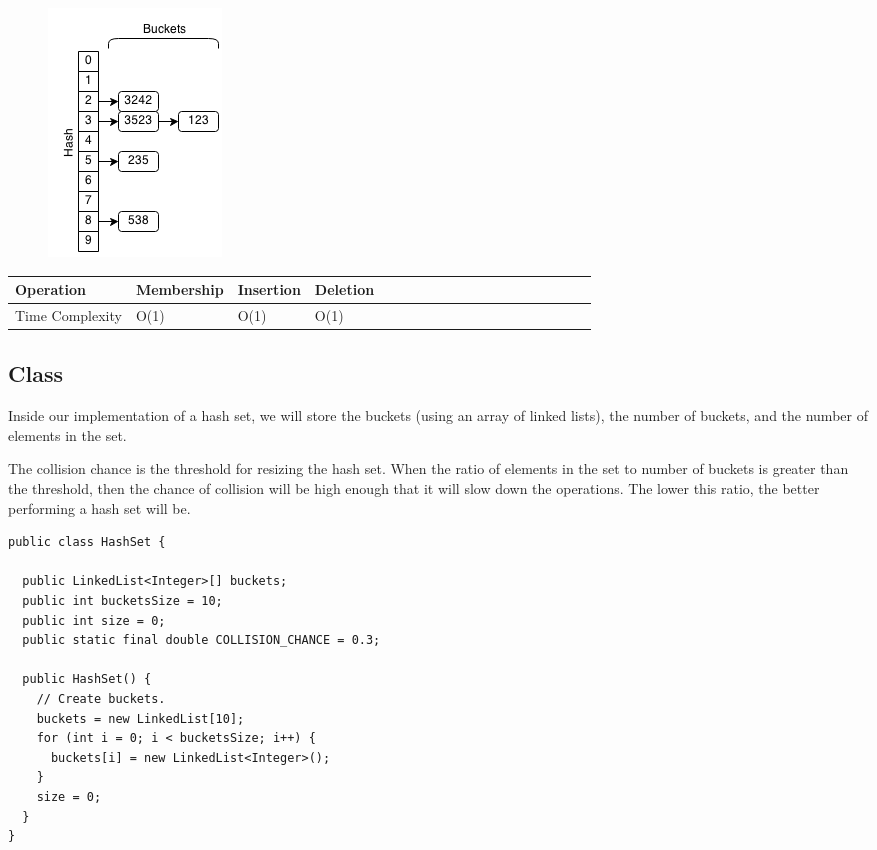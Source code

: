 \documentclass[11pt,oneside]{book}
\makeatletter
\def\maxwidth#1{\ifdim\Gin@nat@width>#1 #1\else\Gin@nat@width\fi}
\makeatother
\begin{document}
\vspace{5px}\begin{figure}[H]\centering
        \includegraphics[width=0.66\maxwidth{\textwidth}]{hashset.png}
        \end{figure}

\begin{center}\begin{tabulary}{0.4\linewidth}{|l|l|l|l|l|l|l|l|l|l|l|l|l|l|l|l|l|l|l}\hline


  Operation &
  Membership &
  Insertion &
  Deletion\\
\hline


  Time Complexity &
  O(1) &
  O(1) &
  O(1)\\

\hline\end{tabulary}\end{center}

\subsection{Class}

Inside our implementation of a hash set, we will store the buckets (using an array of linked lists), the number of buckets, and the number of elements in the set.

The collision chance is the threshold for resizing the hash set. When the ratio of elements in the set to number of buckets is greater than the threshold, then the chance of collision will be high enough that it will slow down the operations. The lower this ratio, the better performing a hash set will be.

\begin{lstlisting}
public class HashSet {

  public LinkedList<Integer>[] buckets;
  public int bucketsSize = 10;
  public int size = 0;
  public static final double COLLISION_CHANCE = 0.3;

  public HashSet() {
    // Create buckets.
    buckets = new LinkedList[10];
    for (int i = 0; i < bucketsSize; i++) {
      buckets[i] = new LinkedList<Integer>();
    }
    size = 0;
  }
}
\end{lstlisting}
\end{document}
